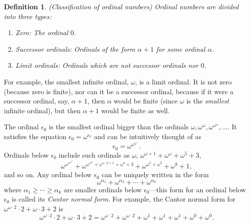 \documentclass{article}
\newtheorem{definition}[theorem]{Definition}
\begin{document}
\begin{definition}
    (Classification of ordinal numbers)
    Ordinal numbers are divided into three types:
    \begin{enumerate}
        \item Zero: The ordinal $0$.
        \item Successor ordinals: Ordinals of the form $\alpha+1$ for some ordinal $\alpha$.
        \item Limit ordinals: Ordinals which are not successor ordinals nor $0$.
    \end{enumerate}
\end{definition}

For example, the smallest infinite ordinal, $\omega$, is a limit ordinal. It is not zero
(because zero is finite),
nor can it be a successor ordinal, because if it were a successor ordinal, say, $\alpha+1$,
then $\alpha$ would be finite (since $\omega$ is the \emph{smallest} infinite ordinal),
but then $\alpha+1$ would be finite as well.

The ordinal $\epsilon_0$ is the smallest ordinal bigger than the ordinals
$\omega,\omega^\omega,\omega^{\omega^\omega},\ldots$. It satisfies the equation
$\epsilon_0=\omega^{\epsilon_0}$ and can be intuitively thought of as
\[
    \epsilon_0 = \omega^{\omega^{\omega^{\iddots}}}.
\]
Ordinals below $\epsilon_0$ include such ordinals as $\omega$,
$\omega^{\omega+1}+\omega^{\omega}+\omega^5+3$,
\[
\omega^{\omega^{\omega^{\omega^\omega}}}+
\omega^{\omega^{\omega^\omega}+\omega^{\omega\cdot 2+1}+\omega^4 + 3}
+ \omega^{\omega^5+\omega^3}+\omega^8+1,
\]
and so on.
Any ordinal below $\epsilon_0$ can be uniquely written in the form
\[
    \omega^{\alpha_1}+\omega^{\alpha_2}+\cdots + \omega^{\alpha_k}
\]
where $\alpha_1\geq\cdots\geq\alpha_k$ are smaller ordinals below $\epsilon_0$---this form
for an ordinal below $\epsilon_0$ is called its \emph{Cantor normal form}.
For example, the Cantor normal form for $\omega^{\omega\cdot 2}\cdot 2+\omega\cdot 3+2$
is
\[
\omega^{\omega\cdot 2}\cdot 2+\omega\cdot 3+2
=
\omega^{\omega\cdot 2} + \omega^{\omega\cdot 2} + \omega^1 + \omega^1 + \omega^1
+\omega^0 + \omega^0.
\]
\end{document}
